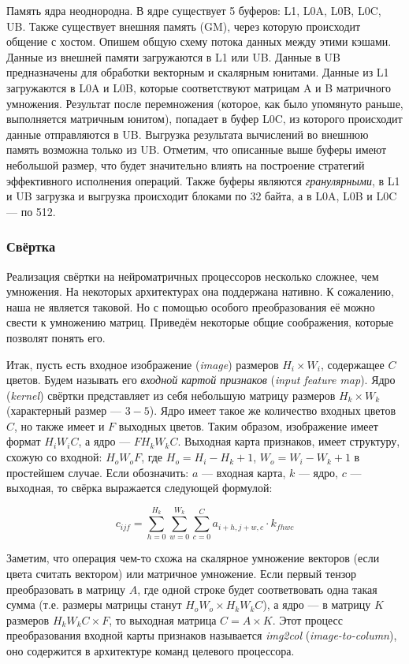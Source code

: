 Память ядра неоднородна. В ядре существует 5 буферов:
L1, L0A, L0B, L0C, UB. Также существует внешняя память (GM), через которую
происходит общение с хостом. Опишем общую схему потока данных между этими кэшами.
Данные из внешней памяти загружаются в L1 или UB. Данные в UB предназначены для
обработки векторным и скалярным юнитами. Данные из L1 загружаются в L0A и L0B,
которые соответствуют матрицам A и B матричного умножения. Результат после
перемножения (которое, как было упомянуто раньше, выполняется матричным юнитом),
попадает в буфер L0C, из которого происходит данные отправляются в UB. Выгрузка
результата вычислений во внешнюю память возможна только из UB. Отметим, что
описанные выше буферы имеют небольшой размер, что будет значительно влиять на
построение стратегий эффективного исполнения операций. Также буферы являются
\textit{гранулярными}, в L1 и UB загрузка и выгрузка происходит блоками по 32
байта, а в L0A, L0B и L0C --- по 512.

\subsubsection{Свёртка}

Реализация свёртки на нейроматричных процессоров несколько сложнее, чем умножения.
На некоторых архитектурах \cite{matmul-strategies} она поддержана нативно. К сожалению, наша
не является таковой. Но с помощью особого преобразования её можно свести к 
умножению матриц. Приведём некоторые общие соображения, которые позволят понять его.

Итак, пусть есть входное изображение (\textit{image}) размеров $H_i \times W_i$,
содержащее $C$ цветов. Будем называть его \textit{входной картой признаков}
(\textit{input feature map}). Ядро (\textit{kernel}) свёртки представляет из
себя небольшую матрицу размеров $H_k \times W_k$ (характерный размер --- $3-5$).
Ядро имеет такое же количество входных цветов $C$, но также имеет и $F$
выходных цветов. Таким образом, изображение имеет формат $H_i W_i C$,
а ядро --- $F H_k W_k C$. Выходная карта признаков, имеет структуру, схожую
со входной: $H_o W_o F$, где $H_o = H_i - H_k + 1$, $W_o = W_i - W_k + 1$
в простейшем случае. Если обозначить: $a$ --- входная карта, $k$ --- ядро,
$c$ --- выходная, то свёрка выражается следующей формулой:

\[
    c_{ijf} = \sum \limits_{h = 0}^{H_k} \sum \limits_{w = 0}^{W_k}
              \sum \limits_{c = 0}^{C} a_{i+h, j+w, c} \cdot k_{f h w c}
\]

Заметим, что операция чем-то схожа на скалярное умножение векторов
(если цвета считать вектором) или матричное умножение. Если первый тензор
преобразовать в матрицу $A$, где одной строке будет соответвовать одна
такая сумма (т.е. размеры матрицы станут $H_o W_o \times H_k W_k C$), а
ядро --- в матрицу $K$ размеров $H_k W_k C \times F$, то выходная
матрица $C = A \times K$. Этот процесс преобразования входной карты
признаков называется \textit{img2col} (\textit{image-to-column}),
оно содержится в архитектуре команд целевого процессора.

